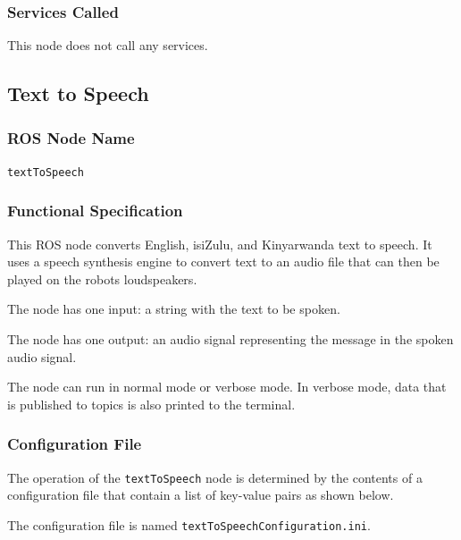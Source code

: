\documentclass{CSSRforAfrica}
\begin{document}
{\subsubsection*{Services Called}
This node does not call any services.








\newpage

\subsection{Text to Speech }

\subsubsection*{ROS Node Name}
 {\small \verb+textToSpeech+}   

\subsubsection*{Functional Specification}
This ROS node converts English, isiZulu, and Kinyarwanda text to speech.  It uses a speech synthesis engine to convert text to an audio file that can then be played on the robots loudspeakers.     

The node has one input: a string with the text to be spoken.  
 
The node has one output: an audio signal representing the message in the spoken audio signal. 

The node can run in normal mode or verbose mode. In verbose mode, data that is published to topics is also printed to the terminal.

\subsubsection*{Configuration File}

The operation of the {\small \verb+textToSpeech+} node is determined by the contents of a configuration file that  contain a list of key-value pairs as shown below.  

\noindent The configuration file is named {\small \verb+textToSpeechConfiguration.ini+}.


}
\end{document}
